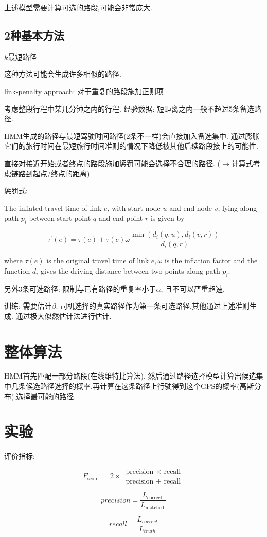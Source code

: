 上述模型需要计算可选的路段,可能会非常庞大.

\subsection{2种基本方法}

$k$最短路径

\begin{remark}
    这种方法可能会生成许多相似的路径.
\end{remark}

link-penalty approach: 对于重复的路段施加正则项

考虑整段行程中某几分钟之内的行程. 经验数据: 短距离之内一般不超过5条备选路径. 

HMM生成的路径与最短驾驶时间路径(2条不一样)会直接加入备选集中. 通过膨胀它们的旅行时间在最短旅行时间准则的情况下降低被其他后续路段接上的可能性.

\begin{remark}
    直接对接近开始或者终点的路段施加惩罚可能会选择不合理的路径. ($\rightarrow$计算式考虑链路到起点/终点的距离)
\end{remark}

惩罚式:

\begin{definition}
    The inflated travel time of link $ e $, with start node $ u $ and end node $ v $, lying along path $ p_{i} $ between start point $ q $ and end point $ r $ is given by

$$ \tau^{\prime}(e)=\tau(e)+\tau(e) \omega \frac{\min \left(d_{i}(q, u), d_{i}(v, r)\right)}{d_{i}(q, r)} $$

where $ \tau(e) $ is the original travel time of link $ e, \omega $ is the inflation factor and the function $ d_{i} $ gives the driving distance
between two points along path $p_i$.
\end{definition}

另外3条可选路径: 限制与已有路径的重复率小于$\alpha$, 且不可以严重超速.

训练: 需要估计$\beta$. 司机选择的真实路径作为第一条可选路径,其他通过上述准则生成. 通过极大似然估计法进行估计.

\section{整体算法}

HMM首先匹配一部分路段(在线维特比算法), 然后通过路径选择模型计算出候选集中几条候选路径选择的概率,再计算在这条路径上行驶得到这个GPS的概率(高斯分布),选择最可能的路径.

\section{实验}

评价指标:

$$ F_{\text {score }}=2 \times \frac{\text { precision } \times \text { recall }}{\text { precision }+\text { recall }} $$

$$precision  =\frac{L_{\text {correct }}}{L_{\text {matched }}} $$

$$recall = \frac{L_{correct}}{L_{truth}}$$